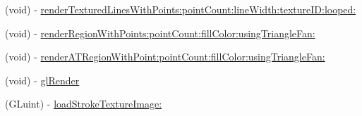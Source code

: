 \begin{DoxyCompactItemize}
\item 
(void) -\/ \hyperlink{interface_b_m_k_overlay_view_a4f1fc6aa6b3dfc3d98469b2221ffabc7}{render\+Textured\+Lines\+With\+Points\+:point\+Count\+:line\+Width\+:texture\+I\+D\+:looped\+:}
\item 
(void) -\/ \hyperlink{interface_b_m_k_overlay_view_a85a054df49b09373b036e22771138ba2}{render\+Region\+With\+Points\+:point\+Count\+:fill\+Color\+:using\+Triangle\+Fan\+:}
\item 
(void) -\/ \hyperlink{interface_b_m_k_overlay_view_a9b277a3ef5cfef2ba6737af997c869d5}{render\+A\+T\+Region\+With\+Point\+:point\+Count\+:fill\+Color\+:using\+Triangle\+Fan\+:}
\item 
(void) -\/ \hyperlink{interface_b_m_k_overlay_view_a0a851a886a4bb7268ea595d3892ab59f}{gl\+Render}
\item 
(G\+Luint) -\/ \hyperlink{interface_b_m_k_overlay_view_aa6768a6f3648c99f7fde290623be0b24}{load\+Stroke\+Texture\+Image\+:}
\end{DoxyCompactItemize}
